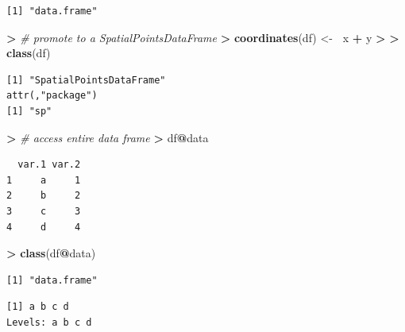\documentclass[]{krantz}
\makeatletter
\newenvironment{Shaded}{\begin{snugshade}}{\end{snugshade}}
\newcommand{\CommentTok}[1]{\textcolor[rgb]{0.37,0.37,0.37}{\textit{#1}}}
\newcommand{\ErrorTok}[1]{\textcolor[rgb]{0.14,0.14,0.14}{\textbf{#1}}}
\newcommand{\FloatTok}[1]{\textcolor[rgb]{0.06,0.06,0.06}{#1}}
\newcommand{\KeywordTok}[1]{\textcolor[rgb]{0.27,0.27,0.27}{\textbf{#1}}}
\newcommand{\NormalTok}[1]{#1}
\newcommand{\OperatorTok}[1]{\textcolor[rgb]{0.43,0.43,0.43}{\textbf{#1}}}
\newcommand{\StringTok}[1]{\textcolor[rgb]{0.5,0.5,0.5}{#1}}
\newenvironment{kframe}{%
\medskip{}
\setlength{\fboxsep}{.8em}
 \def\at@end@of@kframe{}%
 \ifinner\ifhmode%
  \def\at@end@of@kframe{\end{minipage}}%
  \begin{minipage}{\columnwidth}%
 \fi\fi%
 \def\FrameCommand##1{\hskip\@totalleftmargin \hskip-\fboxsep
 \colorbox{shadecolor}{##1}\hskip-\fboxsep
     \hskip-\linewidth \hskip-\@totalleftmargin \hskip\columnwidth}%
 \MakeFramed {\advance\hsize-\width
   \@totalleftmargin\z@ \linewidth\hsize
   \@setminipage}}%
 {\par\unskip\endMakeFramed%
 \at@end@of@kframe}
\renewenvironment{Shaded}{\begin{kframe}}{\end{kframe}}
\makeatother
\begin{document}
\begin{verbatim}
[1] "data.frame"
\end{verbatim}

\begin{Shaded}
\begin{Highlighting}[]
\OperatorTok{>}\StringTok{ }\CommentTok{# promote to a SpatialPointsDataFrame}
\ErrorTok{>}\StringTok{ }\KeywordTok{coordinates}\NormalTok{(df) <-}\StringTok{ }\ErrorTok{~}\NormalTok{x }\OperatorTok{+}\StringTok{ }\NormalTok{y}
\OperatorTok{>}\StringTok{ }
\ErrorTok{>}\StringTok{ }\KeywordTok{class}\NormalTok{(df)}
\end{Highlighting}
\end{Shaded}

\begin{verbatim}
[1] "SpatialPointsDataFrame"
attr(,"package")
[1] "sp"
\end{verbatim}

\begin{Shaded}
\begin{Highlighting}[]
\OperatorTok{>}\StringTok{ }\CommentTok{# access entire data frame}
\ErrorTok{>}\StringTok{ }\NormalTok{df}\OperatorTok{@}\NormalTok{data}
\end{Highlighting}
\end{Shaded}

\begin{verbatim}
  var.1 var.2
1     a     1
2     b     2
3     c     3
4     d     4
\end{verbatim}

\begin{Shaded}
\begin{Highlighting}[]
\OperatorTok{>}\StringTok{ }\KeywordTok{class}\NormalTok{(df}\OperatorTok{@}\NormalTok{data)}
\end{Highlighting}
\end{Shaded}

\begin{verbatim}
[1] "data.frame"
\end{verbatim}

\begin{Shaded}
\end{Shaded}

\begin{verbatim}
[1] a b c d
Levels: a b c d
\end{verbatim}
\end{document}
